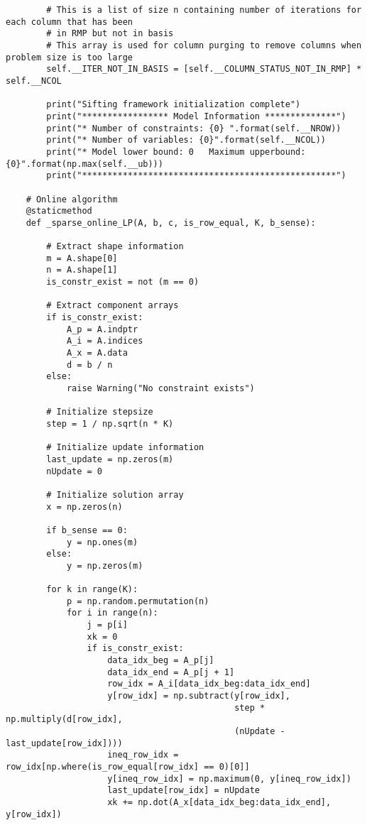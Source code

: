\documentclass{article}
\begin{document}
\begin{lstlisting}
        # This is a list of size n containing number of iterations for each column that has been 
        # in RMP but not in basis
        # This array is used for column purging to remove columns when problem size is too large
        self.__ITER_NOT_IN_BASIS = [self.__COLUMN_STATUS_NOT_IN_RMP] * self.__NCOL

        print("Sifting framework initialization complete")
        print("***************** Model Information **************")
        print("* Number of constraints: {0} ".format(self.__NROW))
        print("* Number of variables: {0}".format(self.__NCOL))
        print("* Model lower bound: 0   Maximum upperbound: {0}".format(np.max(self.__ub)))
        print("**************************************************")

    # Online algorithm
    @staticmethod
    def _sparse_online_LP(A, b, c, is_row_equal, K, b_sense):

        # Extract shape information
        m = A.shape[0]
        n = A.shape[1]
        is_constr_exist = not (m == 0)

        # Extract component arrays
        if is_constr_exist:
            A_p = A.indptr
            A_i = A.indices
            A_x = A.data
            d = b / n
        else:
            raise Warning("No constraint exists")

        # Initialize stepsize
        step = 1 / np.sqrt(n * K)

        # Initialize update information
        last_update = np.zeros(m)
        nUpdate = 0

        # Initialize solution array
        x = np.zeros(n)

        if b_sense == 0:
            y = np.ones(m)
        else:
            y = np.zeros(m)

        for k in range(K):
            p = np.random.permutation(n)
            for i in range(n):
                j = p[i]
                xk = 0
                if is_constr_exist:
                    data_idx_beg = A_p[j]
                    data_idx_end = A_p[j + 1]
                    row_idx = A_i[data_idx_beg:data_idx_end]
                    y[row_idx] = np.subtract(y[row_idx],
                                             step * np.multiply(d[row_idx], 
                                             (nUpdate - last_update[row_idx])))
                    ineq_row_idx = row_idx[np.where(is_row_equal[row_idx] == 0)[0]]
                    y[ineq_row_idx] = np.maximum(0, y[ineq_row_idx])
                    last_update[row_idx] = nUpdate
                    xk += np.dot(A_x[data_idx_beg:data_idx_end], y[row_idx])


\end{lstlisting}
\end{document}
